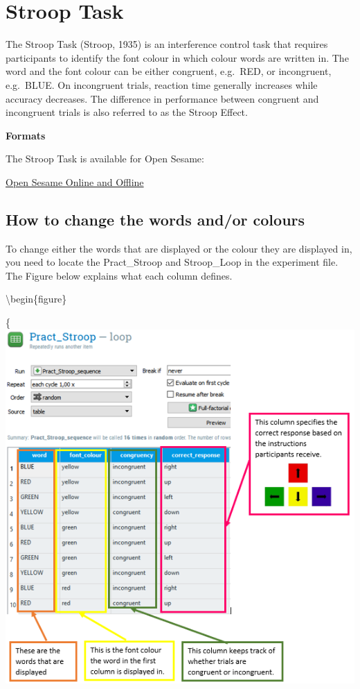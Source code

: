 \documentclass[
]{book}
\begin{document}
\hypertarget{stroop-task}{%
\section{Stroop Task}\label{stroop-task}}

The Stroop Task (Stroop, 1935) is an interference control task that requires participants to identify the font colour in which colour words are written in. The word and the font colour can be either congruent, e.g.~{RED}, or incongruent, e.g.~{BLUE}. On incongruent trials, reaction time generally increases while accuracy decreases. The difference in performance between congruent and incongruent trials is also referred to as the Stroop Effect.

\textbf{Formats}

The Stroop Task is available for Open Sesame:

\href{link\%20here}{Open Sesame Online and Offline}

\hypertarget{how-to-change-the-words-andor-colours}{%
\subsection{How to change the words and/or colours}\label{how-to-change-the-words-andor-colours}}

To change either the words that are displayed or the colour they are displayed in, you need to locate the Pract\_Stroop and Stroop\_Loop in the experiment file. The Figure below explains what each column defines.

\textbackslash begin\{figure\}

\{\centering \includegraphics[width=0.99\linewidth]{images/changestroop/01loop}
\end{document}
